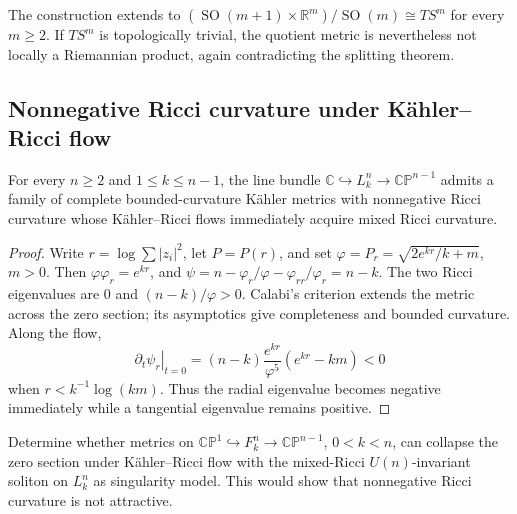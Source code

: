 \begin{remark}
\label{rem:chow-ii-higher-tangent-bundle-counterexamples}
The construction extends to
\((\operatorname{SO}(m+1)\times\mathbb R^m)/\operatorname{SO}(m)\cong TS^m\)
for every \(m\geq2\).  If \(TS^m\) is topologically trivial, the quotient
metric is nevertheless not locally a Riemannian product, again contradicting
the splitting theorem.
\end{remark}

\subsection{Nonnegative Ricci curvature under Kähler--Ricci flow}

\begin{theorem}
\label{thm:chow-ii-kahler-ricci-nonnegative-counterexample}
For every \(n\geq2\) and \(1\leq k\leq n-1\), the line bundle
\(\mathbb C\hookrightarrow L_k^n\to\mathbb{CP}^{n-1}\) admits a family of
complete bounded-curvature Kähler metrics with nonnegative Ricci curvature
whose Kähler--Ricci flows immediately acquire mixed Ricci curvature.
\end{theorem}
\begin{proof}
Write \(r=\log\sum|z_i|^2\), let \(P=P(r)\), and set
\(\varphi=P_r=\sqrt{2e^{kr}/k+m}\), \(m>0\).  Then
\(\varphi\varphi_r=e^{kr}\), and
\(\psi=n-\varphi_r/\varphi-\varphi_{rr}/\varphi_r=n-k\).  The two Ricci
eigenvalues are \(0\) and \((n-k)/\varphi>0\).  Calabi's criterion extends
the metric across the zero section; its asymptotics give completeness and
bounded curvature.  Along the flow,
\[
 \left.\partial_t\psi_r\right|_{t=0}
 =(n-k)\frac{e^{kr}}{\varphi^5}(e^{kr}-km)<0
\]
when \(r<k^{-1}\log(km)\).  Thus the radial eigenvalue becomes negative
immediately while a tangential eigenvalue remains positive.
\end{proof}

\begin{example}
\label{prob:chow-ii-kahler-ricci-attractive-cone}
Determine whether metrics on
\(\mathbb{CP}^1\hookrightarrow F_k^n\to\mathbb{CP}^{n-1}\), \(0<k<n\),
can collapse the zero section under Kähler--Ricci flow with the mixed-Ricci
\(U(n)\)-invariant soliton on \(L_k^n\) as singularity model.  This would
show that nonnegative Ricci curvature is not attractive.
\end{example}

